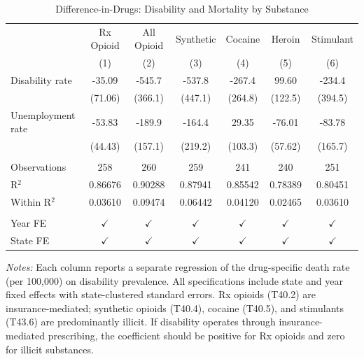 
\begin{table}[htbp]
   \caption{\label{tab:placebo} Difference-in-Drugs: Disability and Mortality by Substance}
   \bigskip
   \centering
   \begin{tabular}{lcccccc}
      \toprule
                        & Rx Opioid     & All Opioid    & Synthetic     & Cocaine       & Heroin        & Stimulant \\   
                        & (1)           & (2)           & (3)           & (4)           & (5)           & (6)\\  
      \midrule 
      Disability rate   & -35.09        & -545.7        & -537.8        & -267.4        & 99.60         & -234.4\\   
                        & (71.06)       & (366.1)       & (447.1)       & (264.8)       & (122.5)       & (394.5)\\   
      Unemployment rate & -53.83        & -189.9        & -164.4        & 29.35         & -76.01        & -83.78\\   
                        & (44.43)       & (157.1)       & (219.2)       & (103.3)       & (57.62)       & (165.7)\\   
       \\
      Observations      & 258           & 260           & 259           & 241           & 240           & 251\\  
      R$^2$             & 0.86676       & 0.90288       & 0.87941       & 0.85542       & 0.78389       & 0.80451\\  
      Within R$^2$      & 0.03610       & 0.09474       & 0.06442       & 0.04120       & 0.02465       & 0.03610\\  
       \\
      Year FE           & $\checkmark$  & $\checkmark$  & $\checkmark$  & $\checkmark$  & $\checkmark$  & $\checkmark$\\   
      State FE          & $\checkmark$  & $\checkmark$  & $\checkmark$  & $\checkmark$  & $\checkmark$  & $\checkmark$\\   
      \bottomrule
   \end{tabular}
   
   \par \raggedright 
   \textit{Notes:} Each column reports a separate regression of the drug-specific death rate (per 100,000) on disability prevalence. All specifications include state and year fixed effects with state-clustered standard errors. Rx opioids (T40.2) are insurance-mediated; synthetic opioids (T40.4), cocaine (T40.5), and stimulants (T43.6) are predominantly illicit. If disability operates through insurance-mediated prescribing, the coefficient should be positive for Rx opioids and zero for illicit substances.
\end{table}



